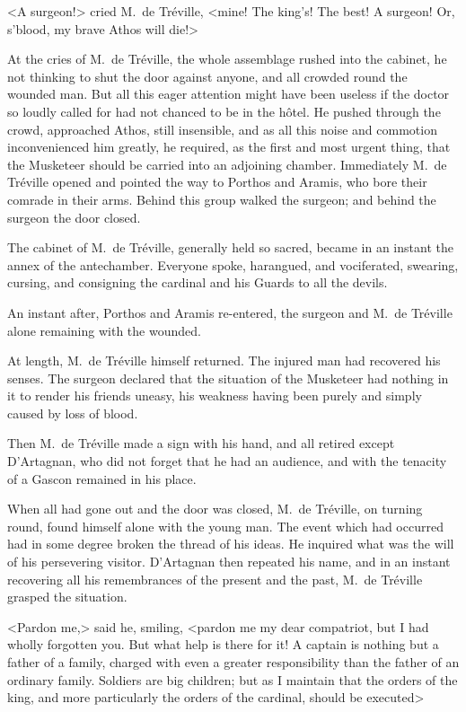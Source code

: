 <A surgeon!> cried M.~de Tréville, <mine! The king's! The best! A surgeon! Or, s'blood, my brave Athos will die!> 

At the cries of M.~de Tréville, the whole assemblage rushed into the cabinet, he not thinking to shut the door against anyone, and all crowded round the wounded man. But all this eager attention might have been useless if the doctor so loudly called for had not chanced to be in the hôtel. He pushed through the crowd, approached Athos, still insensible, and as all this noise and commotion inconvenienced him greatly, he required, as the first and most urgent thing, that the Musketeer should be carried into an adjoining chamber. Immediately M.~de Tréville opened and pointed the way to Porthos and Aramis, who bore their comrade in their arms. Behind this group walked the surgeon; and behind the surgeon the door closed. 

The cabinet of M.~de Tréville, generally held so sacred, became in an instant the annex of the antechamber. Everyone spoke, harangued, and vociferated, swearing, cursing, and consigning the cardinal and his Guards to all the devils. 

An instant after, Porthos and Aramis re-entered, the surgeon and M.~de Tréville alone remaining with the wounded. 

At length, M.~de Tréville himself returned. The injured man had recovered his senses. The surgeon declared that the situation of the Musketeer had nothing in it to render his friends uneasy, his weakness having been purely and simply caused by loss of blood. 

Then M.~de Tréville made a sign with his hand, and all retired except D'Artagnan, who did not forget that he had an audience, and with the tenacity of a Gascon remained in his place. 

When all had gone out and the door was closed, M.~de Tréville, on turning round, found himself alone with the young man. The event which had occurred had in some degree broken the thread of his ideas. He inquired what was the will of his persevering visitor. D'Artagnan then repeated his name, and in an instant recovering all his remembrances of the present and the past, M.~de Tréville grasped the situation. 

<Pardon me,> said he, smiling, <pardon me my dear compatriot, but I had wholly forgotten you. But what help is there for it! A captain is nothing but a father of a family, charged with even a greater responsibility than the father of an ordinary family. Soldiers are big children; but as I maintain that the orders of the king, and more particularly the orders of the cardinal, should be executed\longdash> 

